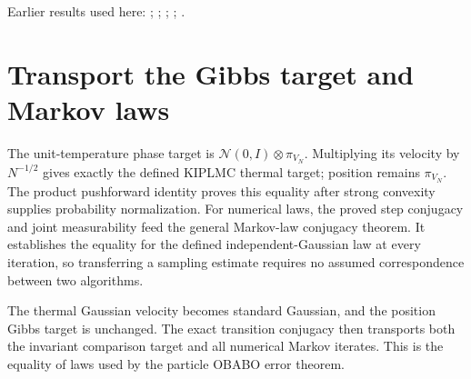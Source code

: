 \documentclass[11pt,a4paper]{article}
\begin{document}
Earlier results used here: \cite[Section~3.20.1]{LangevinLean2026ULASC}; \cite[Section~3.20.3]{LangevinLean2026ULASC}; \cite[Section~3.1.1]{LangevinLean2026IPLA}; \cite[Section~3.20.1]{LangevinLean2026Kinetic}; \cite[Section~3.20.5]{LangevinLean2026Kinetic}.

\section{\texorpdfstring{Transport the Gibbs target and Markov laws}{Transport the Gibbs target and Markov laws}}


The unit-temperature phase target is \(\mathcal N(0,I)\otimes\pi_{V_N}\). Multiplying its velocity by \(N^{-1/2}\) gives exactly the defined KIPLMC thermal target; position remains \(\pi_{V_N}\). The product pushforward identity proves this equality after strong convexity supplies probability normalization. For numerical laws, the proved step conjugacy and joint measurability feed the general Markov-law conjugacy theorem. It establishes the equality for the defined independent-Gaussian law at every iteration, so transferring a sampling estimate requires no assumed correspondence between two algorithms.



The thermal Gaussian velocity becomes standard Gaussian, and the position Gibbs target is unchanged. The exact transition conjugacy then transports both the invariant comparison target and all numerical Markov iterates. This is the equality of laws used by the particle OBABO error theorem.
\end{document}
